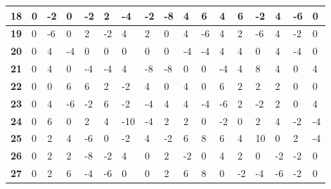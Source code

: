 \begin{longtable}[c]{|l|l|l|l|l|l|l|l|l|l|l|l|l|l|l|l|l|}
\textbf{18} & 0          & -2         & 0          & -2         & 2          & -4         & -2         & -8         & 4          & 6          & 4           & 6           & -2          & 4           & -6          & 0           \\ \hline
\textbf{19} & 0          & -6         & 0          & 2          & -2         & 4          & 2          & 0          & 4          & -6         & 4           & 2           & -6          & 4           & -2          & 0           \\ \hline
\textbf{20} & 0          & 4          & -4         & 0          & 0          & 0          & 0          & 0          & -4         & -4         & 4           & 4           & 0           & 4           & -4          & 0           \\ \hline
\textbf{21} & 0          & 4          & 0          & -4         & -4         & 4          & -8         & -8         & 0          & 0          & -4          & 4           & 8           & 4           & 0           & 4           \\ \hline
\textbf{22} & 0          & 0          & 6          & 6          & 2          & -2         & 4          & 0          & 4          & 0          & 6           & 2           & 2           & 2           & 0           & 0           \\ \hline
\textbf{23} & 0          & 4          & -6         & -2         & 6          & -2         & -4         & 4          & 4          & -4         & -6          & 2           & -2          & 2           & 0           & 4           \\ \hline
\textbf{24} & 0          & 6          & 0          & 2          & 4          & -10        & -4         & 2          & 2          & 0          & -2          & 0           & 2           & 4           & -2          & -4          \\ \hline
\textbf{25} & 0          & 2          & 4          & -6         & 0          & -2         & 4          & -2         & 6          & 8          & 6           & 4           & 10          & 0           & 2           & -4          \\ \hline
\textbf{26} & 0          & 2          & 2          & -8         & -2         & 4          & 0          & 2          & -2         & 0          & 4           & 2           & 0           & -2          & -2          & 0           \\ \hline
\textbf{27} & 0          & 2          & 6          & -4         & -6         & 0          & 0          & 2          & 6          & 8          & 0           & -2          & -4          & -6          & -2          & 0           \\ \hline

\end{longtable}
